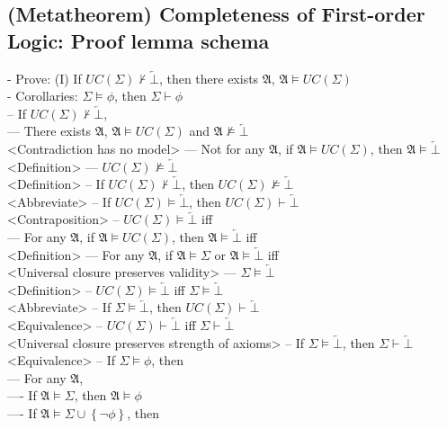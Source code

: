 \documentclass{book}
\newcommand{\inot}{\not}
\newcommand{\contr}{\overleftarrow{\bot}}
\newcommand{\set}[1]{\left\{ #1 \right\}}
\begin{document}
\subsection{(Metatheorem) Completeness of First-order Logic: Proof lemma schema}
	- Prove: (I) If $UC(\Sigma) \inot \vdash \contr$, then there exists $\mathfrak{A}$, $\mathfrak{A} \vDash UC(\Sigma)$ \\
	- Corollaries: $\Sigma \vDash \phi$, then $\Sigma \vdash \phi$ \\
		-- If $UC(\Sigma) \inot \vdash \contr$, \\
			--- There exists $\mathfrak{A}$, $\mathfrak{A} \vDash UC(\Sigma)$ and $\mathfrak{A} \inot \vDash \contr$ \\ <Contradiction has no model>
			--- Not for any $\mathfrak{A}$, if $\mathfrak{A} \vDash UC(\Sigma)$, then $\mathfrak{A} \vDash \contr$ \\ <Definition>
			--- $UC(\Sigma) \inot \vDash \contr$ \\ <Definition>
		-- If $UC(\Sigma) \inot \vdash \contr$, then $UC(\Sigma) \inot \vDash \contr$ \\ <Abbreviate>
		-- If $UC(\Sigma) \vDash \contr$, then $UC(\Sigma) \vdash \contr$ \\ <Contraposition>
		-- $UC(\Sigma) \vDash \contr$ iff \\
			--- For any $\mathfrak{A}$, if $\mathfrak{A} \vDash UC(\Sigma)$, then $\mathfrak{A} \vDash \contr$ iff \\ <Definition>
			--- For any $\mathfrak{A}$, if $\mathfrak{A} \vDash \Sigma$ or $\mathfrak{A} \vDash \contr$ iff \\ <Universal closure preserves validity>
			--- $\Sigma \vDash \contr$ \\ <Definition>
		-- $UC(\Sigma) \vDash \contr$ iff $\Sigma \vDash \contr$ \\ <Abbreviate>
		-- If $\Sigma \vDash \contr$, then $UC(\Sigma) \vdash \contr$ \\ <Equivalence>
		-- $UC(\Sigma) \vdash \contr$ iff $\Sigma \vdash \contr$ \\ <Universal closure preserves strength of axioms>
		-- If $\Sigma \vDash \contr$, then $\Sigma \vdash \contr$ \\ <Equivalence>
		-- If $\Sigma \vDash \phi$, then \\
			--- For any $\mathfrak{A}$, \\ 
				---- If $\mathfrak{A} \vDash \Sigma$, then $\mathfrak{A} \vDash \phi$ \\
				---- If $\mathfrak{A} \vDash \Sigma \cup \set{\lnot \phi}$, then \\
\end{document}
